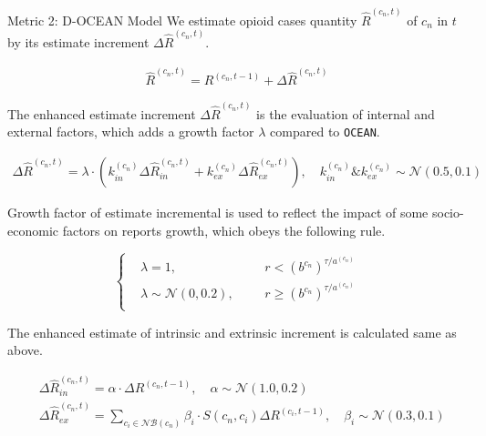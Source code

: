 \documentclass[a4paper]{article}
\begin{document}
\vspace{12pt}
\begin{mybox}[colback=light-gray]{Metric 2: D-OCEAN Model}
  \vspace{10pt}
    We estimate opioid cases quantity $\widehat{R}^{(c_n,t)}$ of $c_n$ in $t$ by its estimate increment $\Delta \widehat{R}^{(c_n,t)}$. 

    \begin{equation}
      \begin{aligned}
        \widehat{R}^{(c_n,t)}=R^{(c_n,t-1)}+\Delta \widehat{R}^{(c_n,t)}
      \end{aligned}
    \end{equation}
    \vspace{10pt}
    
     The enhanced estimate increment $\Delta \widehat{R}^{(c_n,t)}$ is the evaluation of internal and external factors, which adds a growth factor $\lambda$ compared to \texttt{OCEAN}.
    
    \begin{equation}
      \begin{aligned}
        \Delta \widehat{R}^{(c_n,t)}=\lambda \cdot \left(k_{in}^{(c_n)}\Delta \widehat{R}_{in}^{(c_n,t)} + k_{ex}^{(c_n)}\Delta \widehat{R}_{ex}^{(c_n,t)}\right),\quad k_{in}^{(c_n)} \& k_{ex}^{(c_n)}\sim \mathcal{N}(0.5,0.1)
      \end{aligned}
    \end{equation}
    \vspace{10pt}
    
    Growth factor of estimate incremental is used to reflect the impact of some socio-economic factors on reports growth, which obeys the following rule.
    
    \begin{equation}  
    \left\{
    \begin{aligned} 
    &\lambda = 1, &&&r < {(b^{c_n})}^{\tau/a^{(c_n)}} \\
    &\lambda \sim \mathcal{N}(0,0.2), &&& r \ge {(b^{c_n})}^{\tau/a^{(c_n)}} \\
    \end{aligned}
    \right.
    \end{equation} 
    \vspace{10pt}    
    
    The enhanced estimate of intrinsic and extrinsic increment is calculated same as above.
    
    \begin{align}
    & \Delta \widehat{R}_{in}^{(c_n,t)}=\alpha \cdot \Delta R^{(c_n,t-1)},\quad \alpha \sim \mathcal{N}(1.0,0.2)   \label{eq:rel2} \\
    & \Delta \widehat{R}_{ex}^{(c_n,t)}=\sum_{c_i \in \mathcal{NB}(c_n)} \beta_i \cdot S(c_n,c_i)\Delta R^{(c_i,t-1)}, \quad \beta_i \sim \mathcal{N}(0.3,0.1)  \label{eq:rel3}
    \end{align}    

\end{mybox}
\vspace{18pt}
\end{document}
